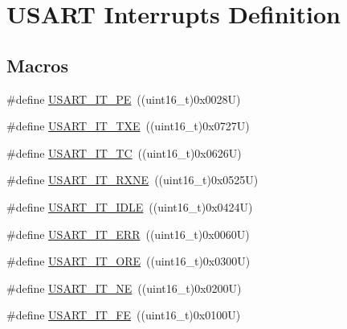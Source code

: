 \hypertarget{group___u_s_a_r_t___interrupt__definition}{}\section{U\+S\+A\+RT Interrupts Definition}
\label{group___u_s_a_r_t___interrupt__definition}
\subsection*{Macros}
\begin{DoxyCompactItemize}
\item 
\#define \hyperlink{group___u_s_a_r_t___interrupt__definition_gae607c28a462c224c575b7541dc4f7067}{U\+S\+A\+R\+T\+\_\+\+I\+T\+\_\+\+PE}~((uint16\+\_\+t)0x0028\+U)
\item 
\#define \hyperlink{group___u_s_a_r_t___interrupt__definition_gab18d0fe889204a4c34f6d5817fb5147d}{U\+S\+A\+R\+T\+\_\+\+I\+T\+\_\+\+T\+XE}~((uint16\+\_\+t)0x0727\+U)
\item 
\#define \hyperlink{group___u_s_a_r_t___interrupt__definition_ga748e86162cc110513330079982821c39}{U\+S\+A\+R\+T\+\_\+\+I\+T\+\_\+\+TC}~((uint16\+\_\+t)0x0626\+U)
\item 
\#define \hyperlink{group___u_s_a_r_t___interrupt__definition_gacdd49b93072655a21a63a35e6431f8ae}{U\+S\+A\+R\+T\+\_\+\+I\+T\+\_\+\+R\+X\+NE}~((uint16\+\_\+t)0x0525\+U)
\item 
\#define \hyperlink{group___u_s_a_r_t___interrupt__definition_ga5d85aab24b7b2dfddb61ba2a49fa6185}{U\+S\+A\+R\+T\+\_\+\+I\+T\+\_\+\+I\+D\+LE}~((uint16\+\_\+t)0x0424\+U)
\item 
\#define \hyperlink{group___u_s_a_r_t___interrupt__definition_ga631e83efd4c4789128d80a9539faf78a}{U\+S\+A\+R\+T\+\_\+\+I\+T\+\_\+\+E\+RR}~((uint16\+\_\+t)0x0060\+U)
\item 
\#define \hyperlink{group___u_s_a_r_t___interrupt__definition_ga8b7d40e02a81be787fbb325bbe6dfbeb}{U\+S\+A\+R\+T\+\_\+\+I\+T\+\_\+\+O\+RE}~((uint16\+\_\+t)0x0300\+U)
\item 
\#define \hyperlink{group___u_s_a_r_t___interrupt__definition_gad5de042f579b50f1e8643009176486b3}{U\+S\+A\+R\+T\+\_\+\+I\+T\+\_\+\+NE}~((uint16\+\_\+t)0x0200\+U)
\item 
\#define \hyperlink{group___u_s_a_r_t___interrupt__definition_ga9af8790f78f6cb1591506c57d0cc0fb3}{U\+S\+A\+R\+T\+\_\+\+I\+T\+\_\+\+FE}~((uint16\+\_\+t)0x0100\+U)
\end{DoxyCompactItemize}


